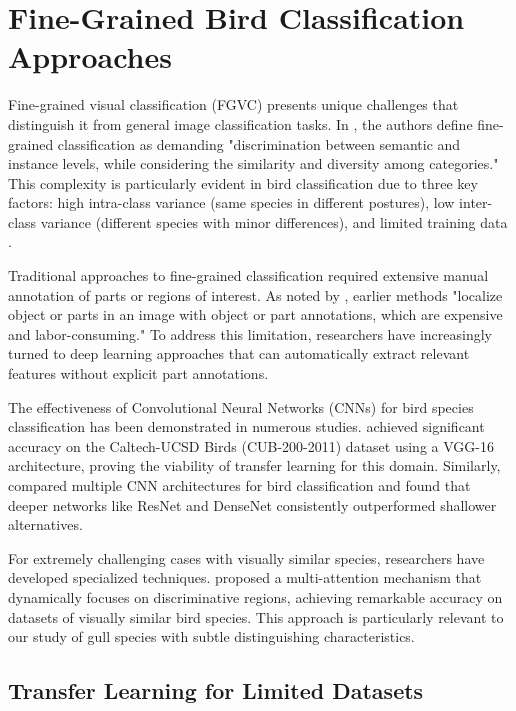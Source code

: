 
\chapter*{Fine-Grained Bird Classification Approaches}

Fine-grained visual classification (FGVC) presents unique challenges that distinguish it from general image classification tasks. In \cite{wei2021fine}, the authors define fine-grained classification as demanding "discrimination between semantic and instance levels, while considering the similarity and diversity among categories." This complexity is particularly evident in bird classification due to three key factors: high intra-class variance (same species in different postures), low inter-class variance (different species with minor differences), and limited training data \cite{he2022transfg}.


Traditional approaches to fine-grained classification required extensive manual annotation of parts or regions of interest. As noted by \cite{zhang2019birds}, earlier methods "localize object or parts in an image with object or part annotations, which are expensive and labor-consuming." To address this limitation, researchers have increasingly turned to deep learning approaches that can automatically extract relevant features without explicit part annotations.


The effectiveness of Convolutional Neural Networks (CNNs) for bird species classification has been demonstrated in numerous studies. \cite{lao2018deep} achieved significant accuracy on the Caltech-UCSD Birds (CUB-200-2011) dataset using a VGG-16 architecture, proving the viability of transfer learning for this domain. Similarly, \cite{cui2021towards} compared multiple CNN architectures for bird classification and found that deeper networks like ResNet and DenseNet consistently outperformed shallower alternatives.


For extremely challenging cases with visually similar species, researchers have developed specialized techniques. \cite{he2022transfg} proposed a multi-attention mechanism that dynamically focuses on discriminative regions, achieving remarkable accuracy on datasets of visually similar bird species. This approach is particularly relevant to our study of gull species with subtle distinguishing characteristics.


\section*{Transfer Learning for Limited Datasets}

